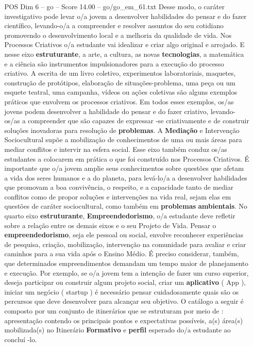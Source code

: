 \begin{textsample}{POS Dim 6 – go – Score 14.00 – go/go\_em\_61.txt}
Desse modo, o caráter investigativo pode levar o/a jovem a desenvolver habilidades do pensar e do fazer científico, levando-o/a a compreender e resolver assuntos do seu cotidiano promovendo o desenvolvimento local e a melhoria da qualidade de vida.
Nos Processos Criativos o/a estudante vai idealizar e criar algo original e arrojado.
E nesse eixo \textbf{estruturante}, a arte, a cultura, as novas \textbf{tecnologias}, a matemática e a ciência são instrumentos impulsionadores para a execução do processo criativo.
A escrita de um livro coletivo, experimentos laboratoriais, maquetes, construção de protótipos, elaboração de situações-problema, uma peça ou um esquete teatral, uma campanha, vídeos ou ações coletivas são alguns exemplos práticos que envolvem os processos criativos.
Em todos esses exemplos, os/as jovens podem desenvolver a habilidade do pensar e do fazer criativo, levando-os/as a compreender que são capazes de expressar -se criativamente e de construir soluções inovadoras para resolução de \textbf{problemas}.
A \textbf{Mediação} e Intervenção Sociocultural supõe a mobilização de conhecimentos de uma ou mais áreas para mediar conflitos e intervir na esfera social.
Esse eixo também conduz os/as estudantes a colocarem em prática o que foi construído nos Processos Criativos.
É importante que o/a jovem amplie seus conhecimentos sobre questões que afetam a vida dos seres humanos e a do planeta, para levá-lo/a a desenvolver habilidades que promovam a boa convivência, o respeito, e a capacidade tanto de mediar conflitos como de propor soluções e intervenções na vida real, sejam elas em questões de caráter sociocultural, como também em \textbf{problemas} \textbf{ambientais}.
No quarto eixo \textbf{estruturante}, \textbf{Empreendedorismo}, o/a estudante deve refletir sobre a relação entre os demais eixos e o seu Projeto de Vida.
Pensar o \textbf{empreendedorismo}, seja ele pessoal ou social, envolve reconhecer experiências de pesquisa, criação, mobilização, intervenção na comunidade para avaliar e criar caminhos para a sua vida após o Ensino Médio.
É preciso considerar, também, que determinados empreendimentos demandam um tempo maior de planejamento e execução.
Por exemplo, se o/a jovem tem a intenção de fazer um curso superior, deseja participar ou construir algum projeto social, criar um \textbf{aplicativo} ( App ), iniciar um negócio ( startup ) é necessário pensar cuidadosamente quais são os percursos que deve desenvolver para alcançar seu objetivo.
O catálogo a seguir é composto por um conjunto de itinerários que se estruturam por meio de : apresentação contendo os principais pontos e expectativas possíveis, a(s) área(s) mobilizada(s) no Itinerário \textbf{Formativo} e \textbf{perfil} esperado do/a estudante ao concluí -lo.

\end{textsample}
